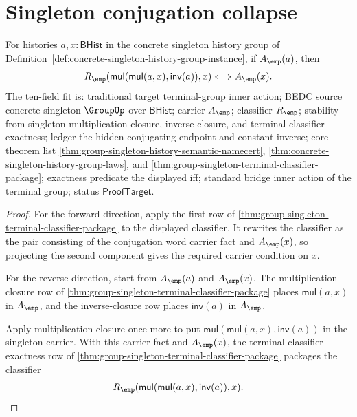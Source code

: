 



\section{Singleton conjugation collapse}
\label{sec:group-singleton-conjugation-collapse}

\begin{theorem}
\label{thm:group-singleton-conjugation-fixed-carrier}
For histories $a,x:\mathsf{BHist}$ in the concrete singleton history group of
Definition~\ref{def:concrete-singleton-history-group-instance}, if
$A_{\emp}(a)$, then
$$
R_{\emp}(\mathsf{mul}(\mathsf{mul}(a,x),\mathsf{inv}(a)),x)
\Longleftrightarrow A_{\emp}(x).
$$
The ten-field fit is: traditional target terminal-group inner action; BEDC
source concrete singleton $\GroupUp$ over $\mathsf{BHist}$; carrier
$A_{\emp}$; classifier $R_{\emp}$; stability from singleton multiplication
closure, inverse closure, and terminal classifier exactness; ledger the hidden
conjugating endpoint and constant inverse; core theorem list
\autoref{thm:group-singleton-history-semantic-namecert},
\autoref{thm:concrete-singleton-history-group-laws}, and
\autoref{thm:group-singleton-terminal-classifier-package}; exactness predicate
the displayed iff; standard bridge inner action of the terminal group; status
$\mathsf{ProofTarget}$.
\end{theorem}
\begin{proof}
For the forward direction, apply the first row of
\autoref{thm:group-singleton-terminal-classifier-package} to the displayed
classifier. It rewrites the classifier as the pair consisting of the conjugation
word carrier fact and $A_{\emp}(x)$, so projecting the second component gives
the required carrier condition on $x$.

For the reverse direction, start from $A_{\emp}(a)$ and $A_{\emp}(x)$. The
multiplication-closure row of
\autoref{thm:group-singleton-terminal-classifier-package} places
$\mathsf{mul}(a,x)$ in $A_{\emp}$, and the inverse-closure row places
$\mathsf{inv}(a)$ in $A_{\emp}$.

Apply multiplication closure once more to put
$\mathsf{mul}(\mathsf{mul}(a,x),\mathsf{inv}(a))$ in the singleton carrier.
With this carrier fact and $A_{\emp}(x)$, the terminal classifier exactness row
of \autoref{thm:group-singleton-terminal-classifier-package} packages the
classifier
$$
R_{\emp}(\mathsf{mul}(\mathsf{mul}(a,x),\mathsf{inv}(a)),x).
$$
\end{proof}

